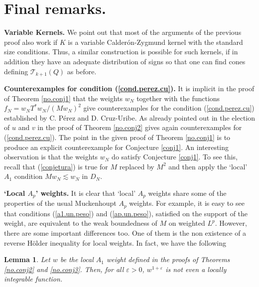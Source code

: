 \documentclass[11pt]{amsart}
\newtheorem{lemma}[teo]{Lemma}
\theoremstyle{definition}
\begin{document}
\bigskip

\section{Final remarks.} 

\noindent\textbf{Variable Kernels.} We point out that most of the arguments of the previous proof also work if $K$ is a variable Calder\'on-Zygmund kernel with the standard size conditions. Thus, a similar construction is possible for such kernels, if in addition they have an adequate distribution of signs so that one can find cones defining $\mathcal T_{k+1}(Q)$ as before.

\bigskip

\noindent\textbf{Counterexamples for condition (\ref{cond.perez.cu}).} It is implicit in the proof of Theorem \ref{no.conj1} that the weights $w_N$ together with the functions $f_N=w_N T^\ast w_N/(Mw_N)^2$ give counterexamples for
the condition (\ref{cond.perez.cu}) established by C. P\'erez and D. Cruz-Uribe. As already pointed out in \cite{RegueraScurry} the election of $u$ and $v$ in the proof of Theorem \ref{no.conj2} gives again counterexamples for (\ref{cond.perez.cu}). The point in the given proof of Theorem \ref{no.conj1} is to produce an explicit counterexample for Conjecture \ref{conj1}. An interesting observation is that the weights $w_N$ do satisfy Conjecture \ref{conj1}. To see this, recall that (\ref{conjetura}) is true for $M$ replaced by $M^2$ and then apply the `local' $A_1$ condition $Mw_N\lesssim w_N$ in $D_N$.

\bigskip

\noindent\textbf{`Local $A_p$' weights.} It is clear that \lq local' $A_p$ weights share some of the properties of the usual Muckenhoupt $A_p$ weights. For example, it is easy to see  that conditions (\ref{a1.un.peso}) and (\ref{ap.un.peso}), satisfied on the support of the weight, are equivalent to the weak boundedness of $M$ on weighted $L^p$. However, there are some important differences too. One of them is the non existence of a reverse H\"older inequality for local weights. In fact, we have the following

\bigskip

\begin{lemma}
Let $w$ be the local $A_1$ weight defined in the proofs of Theorems \ref{no.conj2} and \ref{no.conj3}. Then, for all ${\varepsilon}>0$, $w^{1+{\varepsilon}}$ is not even a locally integrable function.
\end{lemma}
\end{document}
